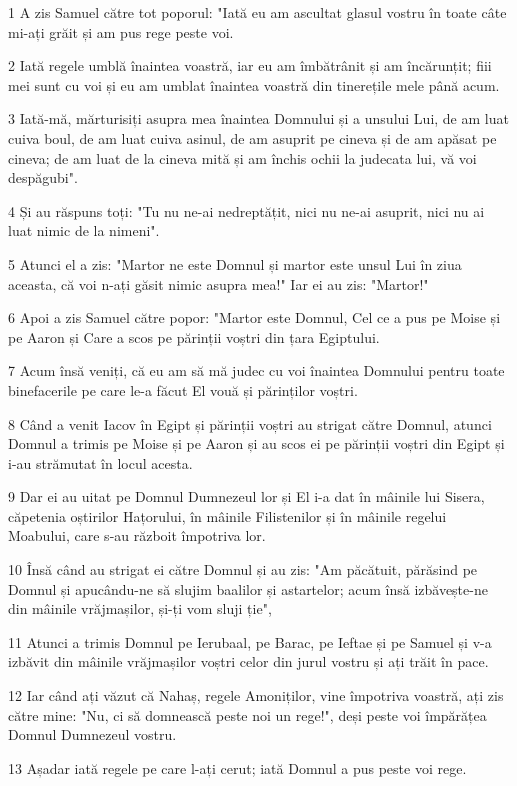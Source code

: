 \par 1 A zis Samuel către tot poporul: "Iată eu am ascultat glasul vostru în toate câte mi-ați grăit și am pus rege peste voi.
\par 2 Iată regele umblă înaintea voastră, iar eu am îmbătrânit și am încărunțit; fiii mei sunt cu voi și eu am umblat înaintea voastră din tinerețile mele până acum.
\par 3 Iată-mă, mărturisiți asupra mea înaintea Domnului și a unsului Lui, de am luat cuiva boul, de am luat cuiva asinul, de am asuprit pe cineva și de am apăsat pe cineva; de am luat de la cineva mită și am închis ochii la judecata lui, vă voi despăgubi".
\par 4 Și au răspuns toți: "Tu nu ne-ai nedreptățit, nici nu ne-ai asuprit, nici nu ai luat nimic de la nimeni".
\par 5 Atunci el a zis: "Martor ne este Domnul și martor este unsul Lui în ziua aceasta, că voi n-ați găsit nimic asupra mea!" Iar ei au zis: "Martor!"
\par 6 Apoi a zis Samuel către popor: "Martor este Domnul, Cel ce a pus pe Moise și pe Aaron și Care a scos pe părinții voștri din țara Egiptului.
\par 7 Acum însă veniți, că eu am să mă judec cu voi înaintea Domnului pentru toate binefacerile pe care le-a făcut El vouă și părinților voștri.
\par 8 Când a venit Iacov în Egipt și părinții voștri au strigat către Domnul, atunci Domnul a trimis pe Moise și pe Aaron și au scos ei pe părinții voștri din Egipt și i-au strămutat în locul acesta.
\par 9 Dar ei au uitat pe Domnul Dumnezeul lor și El i-a dat în mâinile lui Sisera, căpetenia oștirilor Hațorului, în mâinile Filistenilor și în mâinile regelui Moabului, care s-au războit împotriva lor.
\par 10 Însă când au strigat ei către Domnul și au zis: "Am păcătuit, părăsind pe Domnul și apucându-ne să slujim baalilor și astartelor; acum însă izbăvește-ne din mâinile vrăjmașilor, și-ți vom sluji ție",
\par 11 Atunci a trimis Domnul pe Ierubaal, pe Barac, pe Ieftae și pe Samuel și v-a izbăvit din mâinile vrăjmașilor voștri celor din jurul vostru și ați trăit în pace.
\par 12 Iar când ați văzut că Nahaș, regele Amoniților, vine împotriva voastră, ați zis către mine: "Nu, ci să domnească peste noi un rege!", deși peste voi împărățea Domnul Dumnezeul vostru.
\par 13 Așadar iată regele pe care l-ați cerut; iată Domnul a pus peste voi rege.
